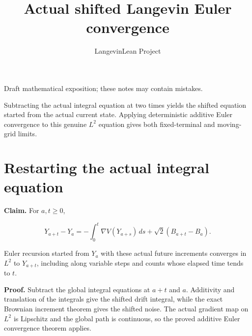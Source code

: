 \documentclass[11pt,a4paper]{article}
\title{\texorpdfstring{Actual shifted Langevin Euler convergence}{Actual shifted Langevin Euler convergence}}
\author{LangevinLean Project}
\date{}
\begin{document}
\maketitle
Draft mathematical exposition; these notes may contain mistakes.


Subtracting the actual integral equation at two times yields the shifted equation started from the actual current state. Applying deterministic additive Euler convergence to this genuine \(L^2\) equation gives both fixed-terminal and moving-grid limits.


\section{\texorpdfstring{Restarting the actual integral equation}{Restarting the actual integral equation}}


\textbf{Claim.} For \(a,t\ge0\),

\[Y_{a+t}-Y_a=-\int_0^t\nabla V(Y_{a+s})\,ds+\sqrt2(B_{a+t}-B_a).\]

Euler recursion started from \(Y_a\) with these actual future increments converges in \(L^2\) to \(Y_{a+t}\), including along variable steps and counts whose elapsed time tends to \(t\).



\textbf{Proof.} Subtract the global integral equations at \(a+t\) and \(a\). Additivity and translation of the integrals give the shifted drift integral, while the exact Brownian increment theorem gives the shifted noise. The actual gradient map on \(L^2\) is Lipschitz and the global path is continuous, so the proved additive Euler convergence theorem applies.
\end{document}
